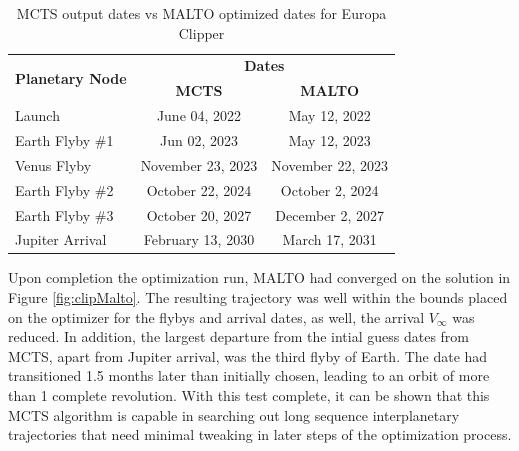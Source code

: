 \documentclass[letterpaper, preprint, paper,11pt]{AAS}	%
\begin{document}
\begin{table}[b!]
    \begin{center}
        \caption{MCTS output dates vs MALTO optimized dates for Europa Clipper}
        \label{table:clipMInputs}
        \begin{tabular}{lcc}
            \toprule
            \multirow{2}{*}{\textbf{Planetary Node}} & \multicolumn{2}{c}{\textbf{Dates}}\\
            \cmidrule{2-3}
            {} & \textbf{MCTS} & \textbf{MALTO}\\
            \midrule
            Launch & June 04, 2022 & May 12, 2022 \\
            Earth Flyby \#1 & Jun 02, 2023 & May 12, 2023 \\
            Venus Flyby & November 23, 2023 & November 22, 2023 \\ 
            Earth Flyby \#2 & October 22, 2024 & October 2, 2024 \\
            Earth Flyby \#3 & October 20, 2027 & December 2, 2027 \\
            Jupiter Arrival & February 13, 2030 & March 17, 2031 \\
            \bottomrule
        \end{tabular}
    \end{center}
\end{table}

Upon completion the optimization run, MALTO had converged on the solution in Figure \ref*{fig:clipMalto}. The resulting trajectory was well within the bounds placed on the optimizer for the flybys and arrival dates, as well, the arrival $V_\infty$ was reduced. In addition, the largest departure from the intial guess dates from MCTS, apart from Jupiter arrival, was the third flyby of Earth. The date had transitioned 1.5 months later than initially chosen, leading to an orbit of more than 1 complete revolution. With this test complete, it can be shown that this MCTS algorithm is capable in searching out long sequence interplanetary trajectories that need minimal tweaking in later steps of the optimization process. %
\end{document}
